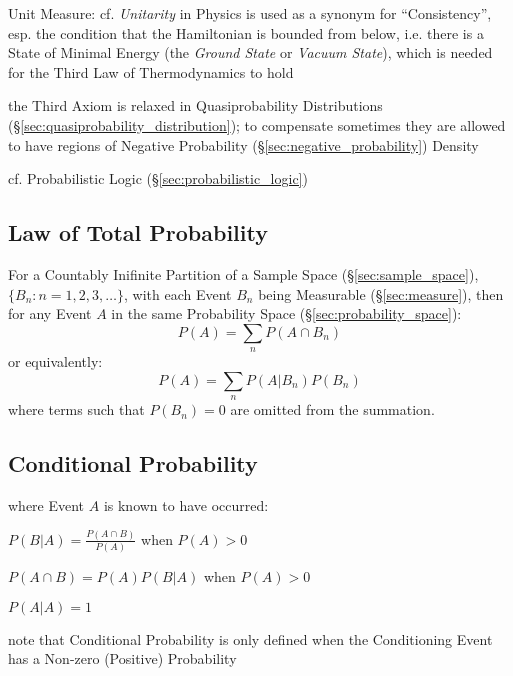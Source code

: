 \fist Unit Measure: cf. \emph{Unitarity} in Physics is used as a synonym for
``Consistency'', esp. the condition that the Hamiltonian is bounded from below,
i.e. there is a State of Minimal Energy (the \emph{Ground State} or
\emph{Vacuum State}), which is needed for the Third Law of Thermodynamics to
hold

the Third Axiom is relaxed in Quasiprobability Distributions
(\S\ref{sec:quasiprobability_distribution}); to compensate sometimes they are
allowed to have regions of Negative Probability
(\S\ref{sec:negative_probability}) Density

\fist cf. Probabilistic Logic (\S\ref{sec:probabilistic_logic})



\subsection{Law of Total Probability}\label{sec:total_probability}

For a Countably Inifinite Partition of a Sample Space
(\S\ref{sec:sample_space}), $\{ B_n : n = 1,2,3,\ldots \}$, with each Event
$B_n$ being Measurable (\S\ref{sec:measure}), then for any Event $A$ in the same
Probability Space (\S\ref{sec:probability_space}):
\[
  P(A) = \sum_n P(A \cap B_n)
\]
or equivalently:
\[
  P(A) = \sum_n P(A|B_n) P(B_n)
\]
where terms such that $P(B_n) = 0$ are omitted from the summation.



\subsection{Conditional Probability}\label{sec:conditional_probability}

where Event $A$ is known to have occurred:

$P(B|A) = \frac{P(A \cap B)}{P(A)}$ when $P(A) > 0$

$P(A \cap B) = P(A) P(B|A)$ when $P(A) > 0$

$P(A|A) = 1$

note that Conditional Probability is only defined when the Conditioning Event
has a Non-zero (Positive) Probability

